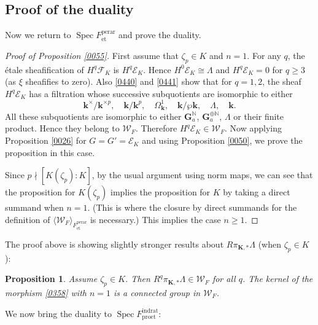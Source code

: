\documentclass{amsart}
\newtheorem{Prop}[Thm]{Proposition}
\theoremstyle{remark}
\numberwithin{equation}{subsection}
\newcommand{\N}{\mathbb{N}}
\newcommand{\et}{\mathrm{et}}
\newcommand{\Ga}{\mathbf{G}_{a}}
\newcommand{\rat}{\mathrm{rat}}
\newcommand{\ind}{\mathrm{ind}}
\newcommand{\pro}{\mathrm{pro}}
\newcommand{\perar}{\mathrm{perar}}
\newcommand{\alg}[1]{\mathbf{#1}}
\newcommand{\genby}[1]{\langle #1 \rangle}
\DeclareMathOperator{\Spec}{Spec}
\begin{document}

\subsection{Proof of the duality}
\label{0052}

Now we return to $\Spec F^{\perar}_{\et}$ and prove the duality.

\begin{proof}[Proof of Proposition \ref{0055}]
	First assume that $\zeta_{p} \in K$ and $n = 1$.
	For any $q$, the \'etale sheafification of $H^{q} \mathcal{F}_{K}$ is $H^{q} \mathcal{E}_{K}$.
	Hence $H^{0} \mathcal{E}_{K} \cong \Lambda$ and $H^{q} \mathcal{E}_{K} = 0$ for $q \ge 3$
	(as $\xi$ sheafifies to zero).
	Also \eqref{0440} and \eqref{0441} show that for $q = 1, 2$,
	the sheaf $H^{q} \mathcal{E}_{K}$ has a filtration
	whose successive subquotients are isomorphic to either
		\[
			\alg{k}^{\times} / \alg{k}^{\times p}, \quad
			\alg{k} / \alg{k}^{p}, \quad
			\Omega_{\alg{k}}^{1}, \quad
			\alg{k} / \wp \alg{k}, \quad
			\Lambda, \quad
			\alg{k}.
		\]
	All these subquotients are isomorphic to either
	$\Ga^{\N}$, $\Ga^{\oplus \N}$, $\Lambda$ or their finite product.
	Hence they belong to $\mathcal{W}_{F}$.
	Therefore $H^{q} \mathcal{E}_{K} \in \mathcal{W}_{F}$.
	Now applying Proposition \ref{0026}
	for $G = G' = \mathcal{E}_{K}$ and using
	Proposition \ref{0050},
	we prove the proposition in this case.
	
	Since $p \nmid [K(\zeta_{p}) : K]$,
	by the usual argument using norm maps,
	we can see that the proposition for $K(\zeta_{p})$ implies the proposition for $K$
	by taking a direct summand when $n = 1$.
	(This is where the closure by direct summands
	for the definition of $\genby{\mathcal{W}_{F}}_{F^{\perar}_{\et}}$ is necessary.)
	This implies the case $n \ge 1$.
\end{proof}

The proof above is showing slightly stronger results about
$R \pi_{\alg{K}, \ast} \Lambda$ (when $\zeta_{p} \in K$):

\begin{Prop} \label{0502}
	Assume $\zeta_{p} \in K$.
	Then $R^{q} \pi_{\alg{K}, \ast} \Lambda \in \mathcal{W}_{F}$ for all $q$.
	The kernel of the morphism \eqref{0358} with $n = 1$ is a connected group in $\mathcal{W}_{F}$.
\end{Prop}

We now bring the duality to $\Spec F^{\ind\rat}_{\pro\et}$:
\end{document}
